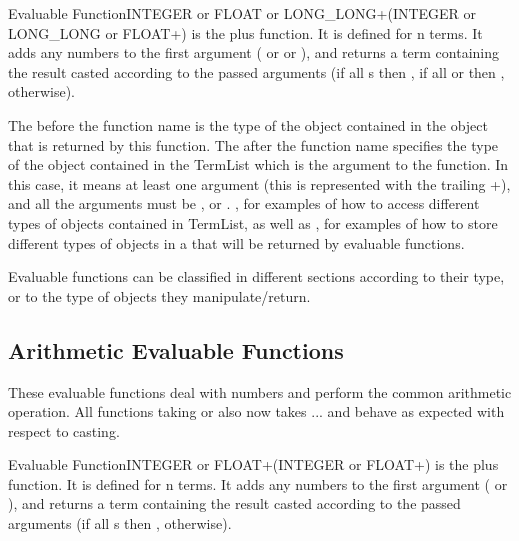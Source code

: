\begin{typeefa}{Evaluable Function}{INTEGER or FLOAT or
    LONG_LONG}{+}{({INTEGER or LONG_LONG or FLOAT}+)} is the plus function.
  It is defined for n terms. It adds any numbers to the first argument
  ( or  or ), and returns a term
  containing the result casted according to the passed arguments (if all
  s then , if all  or
   then ,  otherwise).
\end{typeefa}

The  before the function name \code{+}
is the type of the object contained in the  object that is
returned by this \code{+} function.  The  after the function name specifies the type of the object
contained in the TermList which is the argument to the  function.
In this case, it means at least one argument (this is represented with the
trailing +), and all the arguments must be ,  or
 .  , for examples of how
to access different types of objects contained in TermList, as well as
, for examples of how to
store different types of objects in a  that will be returned by
evaluable functions.

Evaluable functions can be classified in different sections according to their
type, or to the type of objects they manipulate/return.



\subsection{Arithmetic Evaluable Functions}

These evaluable functions deal with numbers and perform the common arithmetic
operation. All functions taking  or  also now
takes ... and behave as expected with respect to casting.

\begin{typeefa}{Evaluable Function}{INTEGER or FLOAT}{+}{({INTEGER or FLOAT}+)}
is the plus function. It is defined for n terms. It adds any numbers to the
first argument ( or ), and returns a term containing
the result casted according to the passed arguments (if all s
then ,  otherwise).
\end{typeefa}

